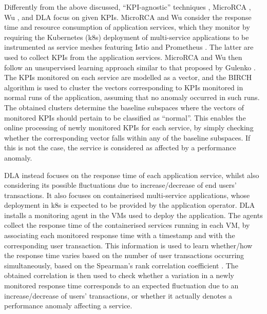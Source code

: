 Differently from the above discussed, \enquote{KPI-agnostic} techniques \cite{37_Gulenko2018_DetectingAnomalousBehaviourBlackBoxServices,13_Mariani2018_LocalizingFaultsCloudSystems}, MicroRCA \cite{04_Wu2020_MicroRCA}, Wu \etal \cite{09_Wu2020_MicroserviceDiagnosisDeepLearning}, and DLA \cite{14_Samir2019_DLA} focus on given KPIs.
MicroRCA \cite{04_Wu2020_MicroRCA} and Wu \etal \cite{09_Wu2020_MicroserviceDiagnosisDeepLearning} consider the response time and resource consumption of application services, which they monitor by requiring the Kubernetes (k8s) deployment of multi-service applications to be instrumented as service meshes featuring Istio \cite{Istio} and Prometheus \cite{Prometheus}.
The latter are used to collect KPIs from the application services. %
MicroRCA \cite{04_Wu2020_MicroRCA} and Wu \etal \cite{09_Wu2020_MicroserviceDiagnosisDeepLearning} then follow an unsupervised learning approach similar to that proposed by Gulenko \etal \cite{37_Gulenko2018_DetectingAnomalousBehaviourBlackBoxServices}.
The KPIs monitored on each service %
are modelled as a vector, and the BIRCH algorithm \cite{Zhang1996_BIRCH} %
is used to cluster the vectors corresponding to KPIs monitored in normal runs of the application, \viz assuming that no anomaly occurred in such runs.
The obtained clusters determine the baseline subspaces where the vectors of monitored KPIs should pertain to be classified as \enquote{normal}. 
This enables the online processing of newly monitored KPIs for each service, by simply checking whether the corresponding vector falls within any of the baseline subspaces. 
If this is not the case, the service is considered as affected by a performance anomaly.

DLA \cite{14_Samir2019_DLA} instead focuses on the response time of each application service, whilst also considering its possible fluctuations due to increase/decrease of end users' transactions.
It also focuses on containerised multi-service applications, whose deployment in k8s is expected to be provided by the application operator. 
DLA \cite{14_Samir2019_DLA} installs a monitoring agent in the VMs used to deploy the application.
The agents collect the response time of the containerised services running in each VM, by associating each monitored response time with a timestamp and with the corresponding user transaction. 
This information is used to learn whether/how the response time varies based on the number of user transactions occurring simultaneously, based on the Spearman’s rank correlation coefficient \cite{Sheskin2011_ParametricNonparametricStatisticalProcedures}.
The obtained correlation is then used to check whether a variation in a newly monitored response time corresponds to an expected fluctuation due to an increase/decrease of users’ transactions, or whether it actually denotes a performance anomaly affecting a service.

